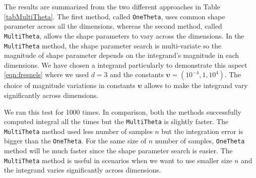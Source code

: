 \documentclass{iitthesis}          %
\newcommand{\bm}[1]{\boldsymbol{#1}}
\newcommand{\code}[1]{\texttt{#1}}
\begin{document}
{{{{{{The results are summarized from the two different approaches in Table \ref{tabMultiTheta}. The first method, called \code{OneTheta}, uses common shape parameter across all the dimensions, whereas the second method, called \code{MultiTheta}, allows the shape parameters to vary across the dimensions. In the \code{MultiTheta} method, the shape parameter search is multi-variate so the magnitude of shape parameter depends on the integrand's magnitude in each dimensions. We have chosen a integrand particularly to demonstrate this aspect \eqref{eqn:fresnels} where we used $d=3$ and the constants $\bm{\upsilon}= (10^{-4}, 1, 10^4)$. The choice of magnitude variations in constants $\bm{\upsilon}$ allows to make the integrand vary significantly across dimensions.

We ran this test for 1000 times. In comparison, both the methods successfully computed integral all the times but the \code{MultiTheta} is slightly faster. The \code{MultiTheta} method used less number of samples $n$ but the integration error is bigger than the \code{OneTheta}. For the same size of $n$ number of samples, \code{OneTheta} method will be much faster since the shape parameter search is easier. The \code{MultiTheta} method is useful in scenarios when we want to use smaller size $n$ and the integrand varies significantly across dimensions.


\iffalse


}}}}}}
\end{document}
